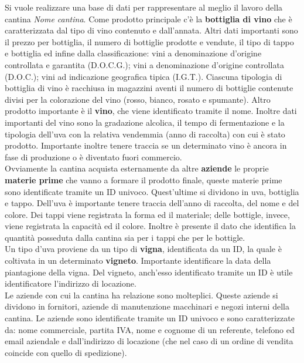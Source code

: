 Si vuole realizzare una base di dati per rappresentare al meglio il lavoro della cantina \emph{Nome cantina}. Come prodotto principale c'è la \textbf{bottiglia di vino} che è caratterizzata dal tipo di vino contenuto e dall'annata. Altri dati importanti sono il prezzo per bottiglia, il numero di bottiglie prodotte e vendute, il tipo di tappo e bottiglia ed infine dalla classificazione: vini a denominazione d'origine controllata e garantita (D.O.C.G.); vini a denominazione d'origine controllata (D.O.C.); vini ad indicazione geografica tipica (I.G.T.). Ciascuna tipologia di bottiglia di vino è racchiusa in magazzini aventi il numero di bottiglie contenute divisi per la colorazione del vino (rosso, bianco, rosato e spumante).
Altro prodotto importante è il \textbf{vino}, che viene identificato tramite il nome. Inoltre dati importanti del vino sono la gradazione alcolica, il tempo di fermentazione e la tipologia dell'uva con la relativa vendemmia (anno di raccolta) con cui è stato prodotto. Importante inoltre tenere traccia se un determinato vino è ancora in fase di produzione o è diventato fuori commercio.\\ Ovviamente la cantina acquista esternamente da altre \textbf{aziende} le proprie \textbf{materie prime} che vanno a formare il prodotto finale, queste materie prime sono identificate tramite un ID univoco. Quest'ultime si dividono in uva, bottiglia e tappo. Dell'uva è importante tenere traccia dell'anno di raccolta, del nome e del colore. Dei tappi viene registrata la forma ed il materiale; delle bottigle, invece, viene registrata la capacità ed il colore. Inoltre è presente il dato che identifica la quantità posseduta dalla cantina sia per i tappi che per le bottigle.\\
Un tipo d'uva proviene da un tipo di \textbf{vigna}, identificata da un ID, la quale è coltivata in un determinato \textbf{vigneto}. Importante identificare la data della piantagione della vigna. Del vigneto, anch'esso identificato tramite un ID è utile identificatore l'indirizzo di locazione.\\
Le aziende con cui la cantina ha relazione sono molteplici. Queste aziende si dividono in fornitori, aziende di manutenzione macchinari e negozi interni della cantina. Le aziende sono identificate tramite un ID univoco e sono caratterizzate da: nome commerciale, partita IVA, nome e cognome di un referente, telefono ed email aziendale e dall'indirizzo di locazione (che nel caso di un ordine di vendita coincide con quello di spedizione).\\
